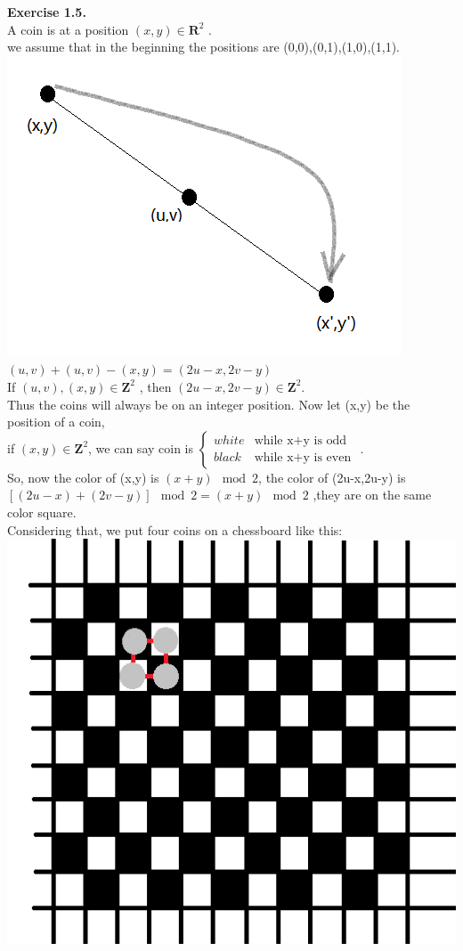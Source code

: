 \documentclass{article}
\begin{document}
\begin{flushleft}
\textbf{Exercise 1.5.} \\
A coin is at a position $(x,y)\in\mathbf{R}^2$ .\\
we assume that in the beginning the positions are (0,0),(0,1),(1,0),(1,1).\\
\includegraphics[scale=1]{1_5_1.png}\\
$(u,v)+(u,v)-(x,y)=(2u-x,2v-y)$\\
If $(u,v),(x,y)\in\mathbf{Z}^2$ , then $(2u-x,2v-y)\in\mathbf{Z}^2$.\\
Thus the coins will always be on an integer position.
Now let (x,y) be the position of a coin,\\
if $(x,y)\in\mathbf{Z}^2$, we can say coin is
$
\left\{\begin{array}{ll}
white & \textrm{while x+y is odd}\\
black & \textrm{while x+y is even}
\end{array} \right.
$
.\\
So, now the color of (x,y) is $(x+y)\mod2$, the color of (2u-x,2u-y) is $[(2u-x)+(2v-y)]\mod2=(x+y)\mod2$
,they are on the same color square.\\
Considering that, we put four coins on a chessboard like this:
\includegraphics[scale=0.8]{1_5_2.png}\\

\end{flushleft}
\end{document}
